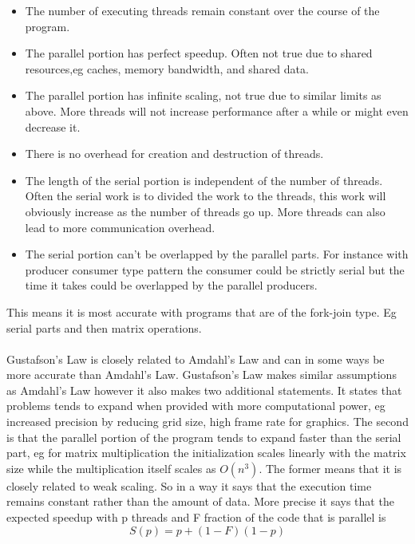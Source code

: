\documentclass[10pt,a4paper]{report}
\begin{document}
\begin{itemize}
  \item The number of executing threads remain constant over the course of the program.
  \item The parallel portion has perfect speedup. Often not true due to shared resources,eg caches, memory bandwidth, and shared data.
  \item The parallel portion has infinite scaling, not true due to similar limits as above. More threads will not increase performance after a while or might even decrease it.
  \item There is no overhead for creation and destruction of threads.
  \item The length of the serial portion is independent of the number of threads. Often the serial work is to divided the work to the threads, this work will obviously increase as the number of threads go up. More threads can also lead to more communication overhead.
  \item The serial portion can't be overlapped by the parallel parts. For instance with producer consumer type pattern the consumer could be strictly serial but the time it takes could be overlapped by the parallel producers.
\end{itemize}

This means it is most accurate with programs that are of the fork-join type. Eg serial parts and then matrix operations.\\
\\
Gustafson's Law is closely related to Amdahl's Law and can in some ways be more accurate than Amdahl's Law. Gustafson's Law makes similar assumptions as Amdahl's Law however it also makes two additional statements. It states that problems tends to expand when provided with more computational power, eg increased precision by reducing grid size, high frame rate for graphics. The second is that the parallel portion of the program tends to expand faster than the serial part, eg for matrix multiplication the initialization scales linearly with the matrix size while the multiplication itself scales as $O(n^3)$. The former means that it is closely related to weak scaling. So in a way it says that the execution time remains constant rather than the amount of data. More precise it says that the expected speedup with p threads and F fraction of the code that is parallel is\cite{gustafson1988reevaluating, cuda_best_practice}
$$S(p)=p+(1-F)(1-p)$$
\end{document}
